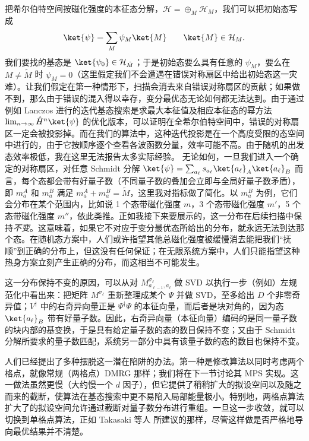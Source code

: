 把希尔伯特空间按磁化强度的本征态分解，${\mathcal H} = \oplus_M {\mathcal H}_M$，我们可以把初始态写成
\begin{equation}
\ket{\psi} = \sum_M \psi_M \ket{M} \quad\quad \ket{M} \in {\mathcal H}_M .
\end{equation}
我们要找的基态是 $\ket{\psi_0} \in {\mathcal H}_{\tilde{M}}$；于是初始态要么具有任意的 $\psi_M$，要么在 $M \neq \tilde{M}$ 时 $\psi_M = 0$（这里假定我们不会遭遇在错误对称扇区中给出初始态这一灾难）。让我们假定在第一种情形下，扫描会消去来自错误对称扇区的贡献；如果做不到，那么由于错误的混入得以幸存，变分最优态无论如何都无法达到。由于通过例如 Lanczos 进行的迭代基态搜索是求最大本征值及相应本征态的幂方法 $\lim_{n\rightarrow\infty} \hat{H}^n \ket{\psi}$ 的优化版本，可以证明在全希尔伯特空间中，错误的对称扇区一定会被投影掉。而在我们的算法中，这种迭代投影是在一个高度受限的态空间中进行的，由于它按顺序逐个查看各波函数分量，效率可能不高。由于随机的出发态效率极低，我在这里无法报告太多实际经验。
无论如何，一旦我们进入一个确定的对称扇区，对任意 Schmidt 分解 $\ket{\psi} = \sum_{a_\ell} s_{a_\ell} \ket{a_\ell}_A \ket{a_\ell}_B$ 而言，每个态都会带有好量子数（不同量子数的叠加会立即与全局好量子数矛盾），即 $m_a^A$ 和 $m_a^B$ 满足 $m_a^A + m_a^B = \tilde{M}$，这里我对指标做了简化。以 $m_a^B$ 为例，它们会分布在某个范围内，比如说 1 个态带磁化强度 $m$，3 个态带磁化强度 $m'$，5 个态带磁化强度 $m''$，依此类推。正如我接下来要展示的，这一分布在后续扫描中保持{\em 不变}。这意味着，如果它不对应于变分最优态所给出的分布，就永远无法到达那个态。在随机态方案中，人们或许指望其他总磁化强度被缓慢消去能把我们``抚顺''到正确的分布上，但这没有任何保证；在无限系统方案中，人们只能指望这种热身方案立刻产生正确的分布，而这相当不可能发生。

这一分布保持不变的原因，可以从对 $M^{\sigma_{\ell}}_{a_{\ell-1},a_{\ell}}$ 做 SVD 以执行一步（例如）左规范化中看出来：把矩阵 $M^{\sigma_{\ell}}$ 重新整理成某个 $\Psi$ 并做 SVD，至多给出 $D$ 个非零奇异值；$V^\dagger$ 中的右奇异向量正是 $\Psi^\dagger \Psi$ 的本征向量，而后者是块对角的，因为态 $\ket{a_{\ell}}_B$ 带有好量子数。因此，右奇异向量（本征向量）编码的是同一量子数的块内部的基变换，于是具有给定量子数的态的数目保持不变；又由于 Schmidt 分解所要求的量子数匹配，系统另一部分中具有该量子数的态的数目也保持不变。

人们已经提出了多种摆脱这一潜在陷阱的办法。第一种是修改算法以同时考虑两个格点，就像常规（两格点）DMRG 那样；我们将在下一节讨论其 MPS 实现。这一做法虽然更慢（大约慢一个 $d$ 因子），但它提供了稍稍扩大的拟设空间以及随之而来的截断，使算法在基态搜索中更不易陷入局部能量极小。特别地，两格点算法扩大了的拟设空间允许通过截断对量子数分布进行重组。一旦这一步收敛，就可以切换到单格点算法，正如 Takasaki 等人 \cite{Takasaki99} 所建议的那样，尽管这样做是否严格地导向最优结果并不清楚\cite{McCulloch08}。

